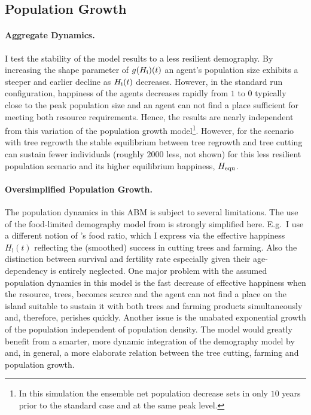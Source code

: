 \FloatBarrier
\subsection{Population Growth}
\paragraph{Aggregate Dynamics.}
I test the stability of the model results to a less resilient demography.
By increasing the shape parameter of $g(H_{\rm i})(t)$ an agent's population size exhibits a steeper and earlier decline as $H_{\rm i}(t)$ decreases.
However, in the standard run configuration, happiness of the agents decreases rapidly from $1$ to $0$ typically close to the peak population size and an agent can not find a place sufficient for meeting both resource requirements.
Hence, the results are nearly independent from this variation of the population growth model\footnote{In this simulation the ensemble net population decrease sets in only $10$ years prior to the standard case and at the same peak level.}.
However, for the scenario with tree regrowth 
the stable equilibrium between tree regrowth and tree cutting can sustain fewer individuals (roughly $2000$ less, not shown) for this less resilient population scenario and its higher equilibrium happiness, $H_{\rm equ}$.

\paragraph{Oversimplified Population Growth.}
The population dynamics in this ABM is subject to several limitations.
The use of the food-limited demography model from \citet{Puleston2017} is strongly simplified here.
E.g.\ I use a different notion of \citet{Puleston2017}'s food ratio, which I express via the effective happiness $H_\text{i}(t)$ reflecting the (smoothed) success in cutting trees and farming.
Also the distinction between survival and fertility rate especially given their age-dependency is entirely neglected.
One major problem with the assumed population dynamics in this model is the fast decrease of effective happiness when the resource, trees, becomes scarce and the agent can not find a place on the island suitable to sustain it with both trees and farming products simultaneously and, therefore, perishes quickly.
Another issue is the unabated exponential growth of the population independent of population density.
The model would greatly benefit from a smarter, more dynamic integration of the demography model by \citet{Puleston2017} and, in general, a more elaborate relation between the tree cutting, farming and population growth.


